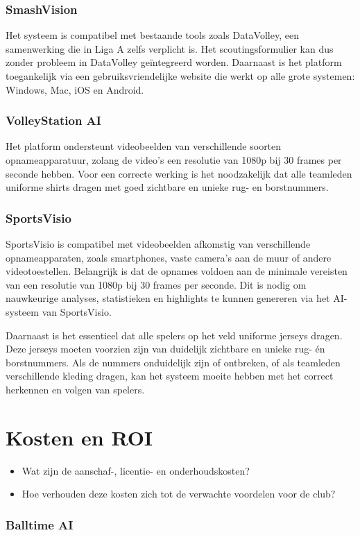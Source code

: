 \subsubsection{SmashVision}
Het systeem is compatibel met bestaande tools zoals DataVolley, een samenwerking die in Liga A zelfs verplicht is. Het scoutingsformulier kan dus zonder probleem in DataVolley geïntegreerd worden. Daarnaast is het platform toegankelijk via een gebruiksvriendelijke website die werkt op alle grote systemen: Windows, Mac, iOS en Android.
\subsubsection{VolleyStation AI}
Het platform ondersteunt videobeelden van verschillende soorten opnameapparatuur, zolang de video's een resolutie van 1080p bij 30 frames per seconde hebben. Voor een correcte werking is het noodzakelijk dat alle teamleden uniforme shirts dragen met goed zichtbare en unieke rug- en borstnummers.
\subsubsection{SportsVisio}
SportsVisio is compatibel met videobeelden afkomstig van verschillende opnameapparaten, zoals smartphones, vaste camera's aan de muur of andere videotoestellen. Belangrijk is dat de opnames voldoen aan de minimale vereisten van een resolutie van 1080p bij 30 frames per seconde. Dit is nodig om nauwkeurige analyses, statistieken en highlights te kunnen genereren via het AI-systeem van SportsVisio.

Daarnaast is het essentieel dat alle spelers op het veld uniforme jerseys dragen. Deze jerseys moeten voorzien zijn van duidelijk zichtbare en unieke rug- én borstnummers. Als de nummers onduidelijk zijn of ontbreken, of als teamleden verschillende kleding dragen, kan het systeem moeite hebben met het correct herkennen en volgen van spelers.

\section{Kosten en ROI}
\begin{itemize}
  \item Wat zijn de aanschaf-, licentie- en onderhoudskosten?
  \item Hoe verhouden deze kosten zich tot de verwachte voordelen voor de club?
\end{itemize}
\subsubsection{Balltime AI}

